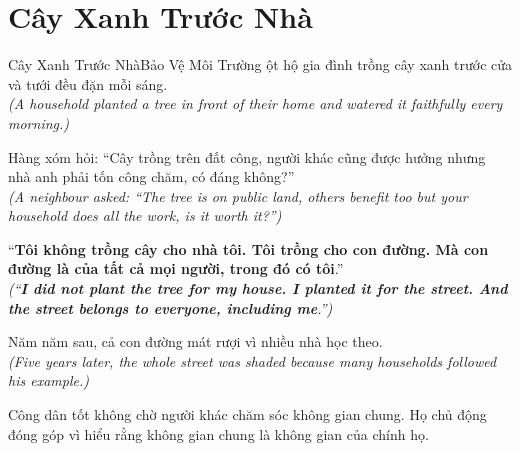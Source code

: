 \section{Cây Xanh Trước Nhà}
\begin{truyen}{Cây Xanh Trước Nhà}{Bảo Vệ Môi Trường}
ột hộ gia đình trồng cây xanh trước cửa và tưới đều đặn mỗi sáng.\\
\textit{(A household planted a tree in front of their home and watered it faithfully every morning.)}

Hàng xóm hỏi: ``Cây trồng trên đất công, người khác cũng được hưởng nhưng nhà anh phải tốn công chăm, có đáng không?''\\
\textit{(A neighbour asked: ``The tree is on public land, others benefit too but your household does all the work, is it worth it?'')}

``\textbf{Tôi không trồng cây cho nhà tôi. Tôi trồng cho con đường. Mà con đường là của tất cả mọi người, trong đó có tôi}.''\\
\textit{(``\textbf{I did not plant the tree for my house. I planted it for the street. And the street belongs to everyone, including me}.'')}

Năm năm sau, cả con đường mát rượi vì nhiều nhà học theo.\\
\textit{(Five years later, the whole street was shaded because many households followed his example.)}
\end{truyen}
\begin{baihoc}
  Công dân tốt không chờ người khác chăm sóc không gian chung. Họ chủ động đóng góp vì hiểu rằng không gian chung là không gian của chính họ.
\end{baihoc}

